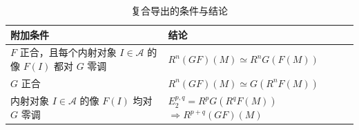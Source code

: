 \begin{table}[htbp]
	\centering
	\caption{复合导出的条件与结论}
	\label{b4:tab:derived-composite-conditions}
	\begin{tabularx}{\textwidth}{@{}>{\raggedright\arraybackslash}X>{\raggedright\arraybackslash}X@{}}
		\toprule
		附加条件 & 结论 \\
		\midrule
		\(F\) 正合，且每个内射对象 \(I\in\mathcal A\) 的像 \(F(I)\) 都对 \(G\) 零调 & \(R^n(GF)(M)\simeq R^nG(F(M))\) \\
		\(G\) 正合 & \(R^n(GF)(M)\simeq G(R^nF(M))\) \\
		内射对象 \(I\in\mathcal A\) 的像 \(F(I)\) 均对 \(G\) 零调 & \(E_2^{p,q}=R^pG(R^qF(M))\)\newline \(\Longrightarrow R^{p+q}(GF)(M)\) \\
		\bottomrule
	\end{tabularx}
\end{table}
